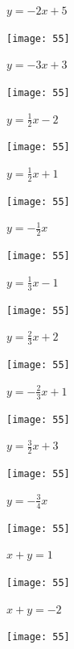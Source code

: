 \documentclass[a4paper]{oblivoir}
\begin{document}
\clearpage
\begin{minipage}{0.45\textwidth}\centering
\(y=-2x+5\)
\par\bigskip\texttt{[image: 55]}
\end{minipage}
\begin{minipage}{0.45\textwidth}\centering
\(y=-3x+3\)
\par\bigskip\texttt{[image: 55]}
\end{minipage}\bigskip\bigskip\par
\begin{minipage}{0.45\textwidth}\centering
\(y=\frac12x-2\)
\par\bigskip\texttt{[image: 55]}
\end{minipage}
\begin{minipage}{0.45\textwidth}\centering
\(y=\frac12x+1\)
\par\bigskip\texttt{[image: 55]}
\end{minipage}\bigskip\bigskip\par
\begin{minipage}{0.45\textwidth}\centering
\(y=-\frac12x\)
\par\bigskip\texttt{[image: 55]}
\end{minipage}
\begin{minipage}{0.45\textwidth}\centering
\(y=\frac13x-1\)
\par\bigskip\texttt{[image: 55]}
\end{minipage}\bigskip\bigskip\par


\clearpage
\begin{minipage}{0.45\textwidth}\centering
\(y=\frac23x+2\)
\par\bigskip\texttt{[image: 55]}
\end{minipage}
\begin{minipage}{0.45\textwidth}\centering
\(y=-\frac23x+1\)
\par\bigskip\texttt{[image: 55]}
\end{minipage}\bigskip\bigskip\par
\begin{minipage}{0.45\textwidth}\centering
\(y=\frac32x+3\)
\par\bigskip\texttt{[image: 55]}
\end{minipage}
\begin{minipage}{0.45\textwidth}\centering
\(y=-\frac34x\)
\par\bigskip\texttt{[image: 55]}
\end{minipage}\bigskip\bigskip\par
\begin{minipage}{0.45\textwidth}\centering
\(x+y=1\)
\par\bigskip\texttt{[image: 55]}
\end{minipage}
\begin{minipage}{0.45\textwidth}\centering
\(x+y=-2\)
\par\bigskip\texttt{[image: 55]}
\end{minipage}\bigskip\bigskip\par
\end{document}
